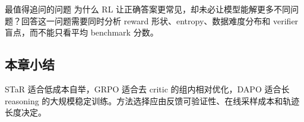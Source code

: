 
\begin{importantbox}{最值得追问的问题}
为什么 RL 让正确答案更常见，却未必让模型能解更多不同问题？回答这一问题需要同时分析 reward 形状、entropy、数据难度分布和 verifier 盲点，而不能只看平均 benchmark 分数。
\end{importantbox}

\subsection{本章小结}

STaR 适合低成本自举，GRPO 适合去 critic 的组内相对优化，DAPO 适合长 reasoning 的大规模稳定训练。方法选择应由反馈可验证性、在线采样成本和轨迹长度决定。

